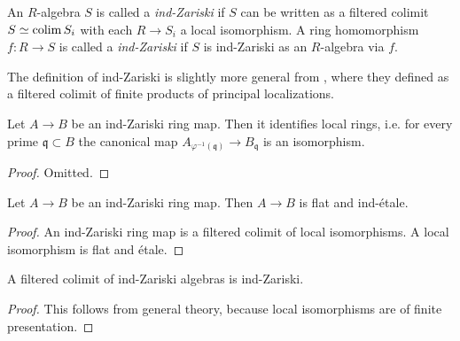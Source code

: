\begin{definition}
    \label{def:ind-Zariski}
    \leanok
    An $R$-algebra $S$ is called a \emph{ind-Zariski} if $S$ can be written as a filtered colimit $S \simeq \operatorname{colim} S_i$ with each $R \to S_i$ a local isomorphism. A ring homomorphism $f : R \to S$ is called a \emph{ind-Zariski} if $S$ is ind-Zariski as an $R$-algebra via $f$.
\end{definition}

\begin{remark}
  The definition of ind-Zariski is slightly more general from \cite[Definition 2.2.1(iv)]{proetale}, where they defined as a filtered colimit of finite products of principal localizations.
\end{remark}

\begin{lemma}
  Let $A \to B$ be an ind-Zariski ring map. Then it identifies local rings, i.e. for every prime $\mathfrak{q} \subset B$ the canonical map $A_{\varphi^{-1}(\mathfrak{q})} \to B_{\mathfrak{q}}$ is an isomorphism.
  \label{thm:ind-Zariski-identifies-local-rings}
\end{lemma}

\begin{proof}
  Omitted.
\end{proof}

\begin{lemma}
  Let $A \to B$ be an ind-Zariski ring map. Then $A \to B$ is flat and ind-étale.
  \label{thm:ind-Zariski-is-flat-ind-etale}
\end{lemma}

\begin{proof}
  An ind-Zariski ring map is a filtered colimit of local isomorphisms. A local isomorphism is flat and étale.
\end{proof}

\begin{lemma}
    A filtered colimit of ind-Zariski algebras is ind-Zariski.
    \label{lemma:ind-ind-Zariski}
\end{lemma}

\begin{proof}
    This follows from general theory, because local isomorphisms are of finite presentation.
\end{proof}

